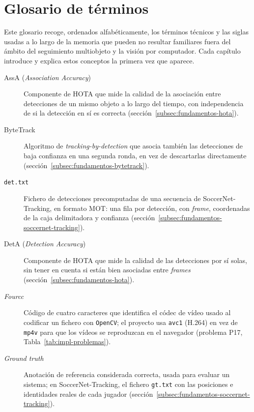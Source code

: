 \chapter*{Glosario de términos}
\label{cap:glosario}

Este glosario recoge, ordenados alfabéticamente, los términos técnicos y
las siglas usadas a lo largo de la memoria que pueden no resultar
familiares fuera del ámbito del seguimiento multiobjeto y la visión por
computador. Cada capítulo introduce y explica estos conceptos la primera
vez que aparece.

\begin{description}
\item[AssA (\emph{Association Accuracy})] Componente de HOTA que mide la
  calidad de la asociación entre detecciones de un mismo objeto a lo largo
  del tiempo, con independencia de si la detección en sí es correcta
  (sección~\ref{subsec:fundamentos-hota}).

\item[ByteTrack] Algoritmo de \emph{tracking-by-detection} que asocia
  también las detecciones de baja confianza en una segunda ronda, en vez
  de descartarlas directamente (sección~\ref{subsec:fundamentos-bytetrack}).

\item[\texttt{det.txt}] Fichero de detecciones precomputadas de una
  secuencia de SoccerNet-Tracking, en formato MOT: una fila por detección,
  con \emph{frame}, coordenadas de la caja delimitadora y confianza
  (sección~\ref{subsec:fundamentos-soccernet-tracking}).

\item[DetA (\emph{Detection Accuracy})] Componente de HOTA que mide la
  calidad de las detecciones por sí solas, sin tener en cuenta si están
  bien asociadas entre \emph{frames} (sección~\ref{subsec:fundamentos-hota}).

\item[\emph{Fourcc}] Código de cuatro caracteres que identifica el códec
  de vídeo usado al codificar un fichero con \texttt{OpenCV}; el proyecto
  usa \texttt{avc1} (H.264) en vez de \texttt{mp4v} para que los vídeos se
  reproduzcan en el navegador (problema P17,
  Tabla~\ref{tab:impl-problemas}).

\item[\emph{Ground truth}] Anotación de referencia considerada correcta,
  usada para evaluar un sistema; en SoccerNet-Tracking, el fichero
  \texttt{gt.txt} con las posiciones e identidades reales de cada jugador
  (sección~\ref{subsec:fundamentos-soccernet-tracking}).


\end{description}
